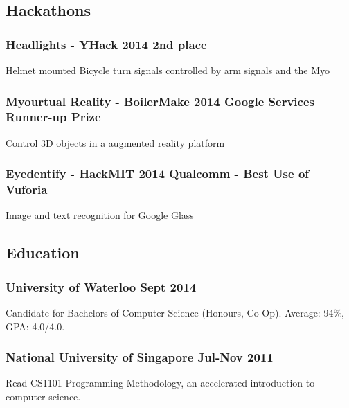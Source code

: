 \documentclass[letterpaper]{article}
\begin{document}
\vspace{1em}

\begin{center}
\section*{Hackathons}
\end{center}

\subsubsection*{Headlights - YHack 2014 \hfill 2nd place}

Helmet mounted Bicycle turn signals controlled by arm signals and the Myo

\subsubsection*{Myourtual Reality - BoilerMake 2014 \hfill Google Services Runner-up Prize}

Control 3D objects in a augmented reality platform

\subsubsection*{Eyedentify - HackMIT 2014 \hfill Qualcomm - Best Use of Vuforia}

Image and text recognition for Google Glass

\vspace{1em}

\begin{center}
\section*{Education}
\end{center}

\subsubsection*{University of Waterloo \hfill Sept 2014}
Candidate for Bachelors of Computer Science (Honours, Co-Op). Average: 94\%, GPA: 4.0/4.0.

\subsubsection*{National University of Singapore \hfill Jul-Nov 2011}
Read CS1101 Programming Methodology, an accelerated introduction to computer science.
\end{document}
